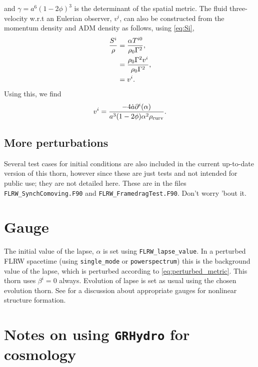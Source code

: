 and $\gamma = a^6 (1-2\phi)^3$ is the determinant of the spatial metric. The fluid three-velocity w.r.t an Eulerian observer, $v^i$, can also be constructed from the momentum density and ADM density as follows, using \eqref{eq:Si},
\begin{align}
	\frac{S^i}{\rho} &= \frac{\alpha T^{i0}}{\rho_0\Gamma^2}, \\
	&= \frac{\rho_0 \Gamma^2 v^i}{\rho_0\Gamma^2}, \\
	&= v^i.
\end{align}
Using this, we find
\begin{equation}
	v^i = \frac{- 4\dot{a}\partial^i (\alpha)}{a^3 (1-2\phi) \alpha^2 \rho_{\rm curv}}.
\end{equation}




\subsection{More perturbations}
Several test cases for initial conditions are also included in the current up-to-date version of this thorn, however since these are just tests and not intended for public use; they are not detailed here. These are in the files {\tt FLRW\_SynchComoving.F90} and {\tt FLRW\_FramedragTest.F90}. Don't worry 'bout it.



\section{Gauge}
\label{sec:gauge}

The initial value of the lapse, $\alpha$ is set using \texttt{FLRW\_lapse\_value}. In a perturbed FLRW spacetime (using {\tt single\_mode} or {\tt powerspectrum}) this is the background value of the lapse, which is perturbed according to \eqref{eq:perturbed_metric}. This thorn uses $\beta^i=0$ always. Evolution of lapse is set as usual using the chosen evolution thorn. See \cite{macpherson2019} for a discussion about appropriate gauges for nonlinear structure formation. 




\section{Notes on using {\tt GRHydro} for cosmology}
\label{sec:note}

